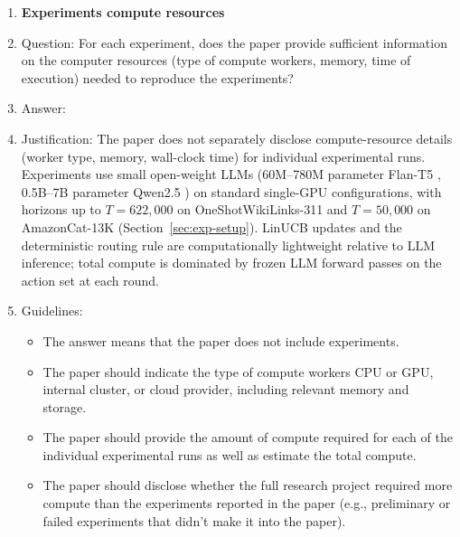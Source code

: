 \documentclass{article}
\theoremstyle{definition}
\theoremstyle{remark}
\theoremstyle{remark}
\begin{document}
\begin{enumerate}
\begin{itemize}
        \item For asymmetric distributions, the authors should be careful not to show in tables or figures symmetric error bars that would yield results that are out of range (e.g., negative error rates).
        \item If error bars are reported in tables or plots, the authors should explain in the text how they were calculated and reference the corresponding figures or tables in the text.
    \end{itemize}

\item {\bf Experiments compute resources}
    \item[] Question: For each experiment, does the paper provide sufficient information on the computer resources (type of compute workers, memory, time of execution) needed to reproduce the experiments?
    \item[] Answer: \answerNo{} %
    \item[] Justification: The paper does not separately disclose compute-resource details (worker type, memory, wall-clock time) for individual experimental runs. Experiments use small open-weight LLMs (60M--780M parameter Flan-T5 \cite{chung2024scaling}, 0.5B--7B parameter Qwen2.5 \cite{hui2024qwen2}) on standard single-GPU configurations, with horizons up to $T=622{,}000$ on OneShotWikiLinks-311 and $T=50{,}000$ on AmazonCat-13K (Section~\ref{sec:exp-setup}). LinUCB updates and the deterministic routing rule are computationally lightweight relative to LLM inference; total compute is dominated by frozen LLM forward passes on the action set at each round.
    \item[] Guidelines:
    \begin{itemize}
        \item The answer \answerNA{} means that the paper does not include experiments.
        \item The paper should indicate the type of compute workers CPU or GPU, internal cluster, or cloud provider, including relevant memory and storage.
        \item The paper should provide the amount of compute required for each of the individual experimental runs as well as estimate the total compute. 
        \item The paper should disclose whether the full research project required more compute than the experiments reported in the paper (e.g., preliminary or failed experiments that didn't make it into the paper). 
    \end{itemize}
    

\end{enumerate}
\end{document}
